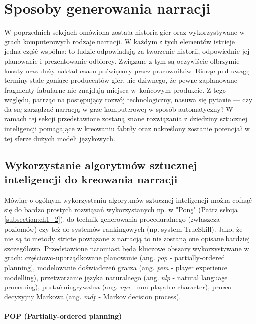 \graphicspath{{chapters/chapter4/imgs/}}

\chapter{Sposoby generowania narracji}\label{chapter:ch4}

W poprzednich sekcjach omówiona została historia gier oraz wykorzystywane w grach komputerowych rodzaje
narracji. W każdym z tych elementów istnieje jedna część wspólna: to ludzie odpowiadają za tworzenie
historii, odpowiednie jej planowanie i prezentowanie odbiorcy. Związane z tym są oczywiście olbrzymie
koszty oraz duży nakład czasu poświęcony przez pracowników. Biorąc pod uwagę terminy stale goniące
producentów gier, nic dziwnego, że pewne zaplanowane fragmenty fabularne nie znajdują miejsca w~końcowym
produkcie. Z tego względu, patrząc na postępujący rozwój technologiczny, nasuwa się pytanie ---
czy da się zarządzać narracją w grze komputerowej w sposób automatyczny? W ramach tej sekcji
przedstawione zostaną znane rozwiązania z dziedziny sztucznej inteligencji pomagające w kreowaniu fabuły
oraz nakreślony zostanie potencjał w tej sferze dużych modeli językowych.

\section{Wykorzystanie algorytmów sztucznej inteligencji do kreowania narracji}\label{section:ch4_1}

Mówiąc o ogólnym wykorzystaniu algorytmów sztucznej inteligencji można cofnąć się do bardzo prostych
rozwiązań wykorzystanych np. w "Pong" (Patrz sekcja \ref{subsection:ch1_2}), do technik generowania
proceduralnego (zwłaszcza poziomów) czy też do systemów rankingowych (np. system TrueSkill). Jako, że
nie są to metody stricte powiązane z narracją to nie zostaną one opisane bardziej szczegółowo.
Przedstawione natomiast będą kluczowe obszary wykorzystywane w grach: częściowo-uporządkowane planowanie
(ang. \textit{\gls{pop}} - partially-ordered planning), modelowanie doświadczeń gracza (ang. \textit{\gls{pem}} -
player experience modelling), przetwarzanie języka naturalnego (ang. \textit{\gls{nlp}} - natural language
processing), postać niegrywalna (ang. \textit{\gls{npc}} - non-playable character), proces decyzyjny Markowa
(ang. \textit{\gls{mdp}} - Markov decision process).

\subsubsection*{POP (Partially-ordered planning)}

